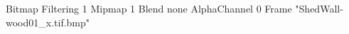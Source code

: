 {Bitmap
	{Filtering 1}
	{Mipmap 1}
	{Blend none}
	{AlphaChannel 0}
	{Frame "ShedWall-wood01_x.tif.bmp"}
}
